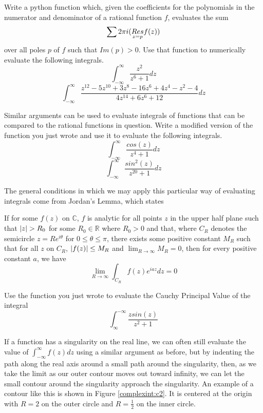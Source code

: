 \begin{problem}
Write a python function which, given the coefficients for the polynomials in the numerator and denominator of a rational function $f$, evaluates the sum
\[\sum 2\pi i (\underset{z=p}{Res} f(z))\]
over all poles $p$ of $f$ such that $Im(p)>0$.
Use that function to numerically evaluate the following integrals.
\[\int_{-\infty}^{\infty} \frac{z^2}{z^6+1}dz\]
\[\int_{-\infty}^{\infty} \frac{z^{12}-5z^{10}+3z^8-16z^6+4z^4-z^2-4}{4z^{14}+6z^6+12}dz\]
\end{problem}

\begin{problem}
Similar arguments can be used to evaluate integrals of functions that can be compared to the rational functions in question.
Write a modified version of the function you just wrote and use it to evaluate the following integrals.
\[\int_{-\infty}^{\infty}\frac{cos(z)}{z^4+1}dz\]
\[\int_{-\infty}^{\infty}\frac{sin^2(z)}{z^{20}+1}dz\]
\end{problem}

The general conditions in which we may apply this particular way of evaluating integrals come from Jordan's Lemma, which states
\begin{lemma}
If for some $f(z)$ on $\mathbb{C}$, $f$ is analytic for all points $z$ in the upper half plane such that $\left\lvert z\right\rvert>R_0$ for some $R_0 \in \mathbb{R}$ where $R_0 >0$ and that, where $C_R$ denotes the semicircle $z=Re^{i\theta}$ for $0\leq \theta \leq \pi$, there exists some positive constant $M_R$ such that for all $z$ on $C_R$, $\left\lvert f(z)\right\rvert \leq M_R$ and $\lim_{R \to \infty} M_R = 0$, then for every positive constant $a$, we have
\[\lim_{R \to \infty} \int_{C_R} f(z) e^{iaz} dz = 0\]
\end{lemma}

\begin{problem}
Use the function you just wrote to evaluate the Cauchy Principal Value of the integral
\[\int_{\infty}^{-\infty} \frac{z sin(z)}{z^2+1}\]
\end{problem}

If a function has a singularity on the real line, we can often still evaluate the value of $\int_{-\infty}^{\infty} f(z) dz$ using a similar argument as before, but by indenting the path along the real axis around a small path around the singularity, then, as we take the limit as our outer contour moves out toward infinity, we can let the small contour around the singularity approach the singularity.
An example of a contour like this is shown in Figure \ref{complexint:c2}.
It is centered at the origin with $R=2$ on the outer circle and $R=\frac{1}{2}$ on the inner circle.

